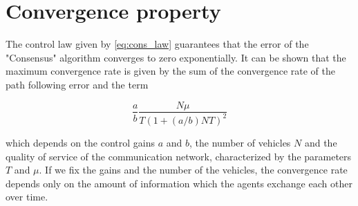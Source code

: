 \section{Convergence property\label{sec:convergence_property}}

The control law given by \eqref{eq:cons_law} guarantees that the error of the
"Consensus" algorithm converges to zero exponentially.
It can be shown that the maximum convergence rate is given by the sum of
the convergence rate of the path following error and the term

\begin{equation}
  \frac{a}{b} \frac{N \mu}{T ( 1 + (a / b) N T)^2}
\end{equation}

which depends on the control gains $a$ and $b$, the number of vehicles $N$ and
the quality of service of the communication network, characterized by the parameters
$T$ and $\mu$.
If we fix the gains and the number of the vehicles, the convergence rate depends
only on the amount of information which the agents exchange each other over time.
